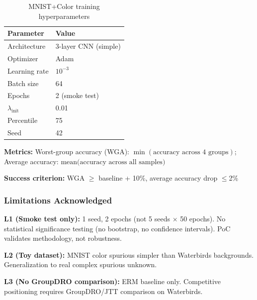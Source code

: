 \begin{table}[h]
\centering
\caption{MNIST+Color training hyperparameters}
\label{tab:mnist_config}
\begin{tabular}{ll}
\toprule
Parameter & Value \\
\midrule
Architecture & 3-layer CNN (simple) \\
Optimizer & Adam \\
Learning rate & $10^{-3}$ \\
Batch size & 64 \\
Epochs & 2 (smoke test) \\
$\lambda_{\text{init}}$ & 0.01 \\
Percentile & 75 \\
Seed & 42 \\
\bottomrule
\end{tabular}
\end{table}

\textbf{Metrics:}
Worst-group accuracy (WGA): $\min(\text{accuracy across 4 groups})$;
Average accuracy: $\text{mean(accuracy across all samples)}$

\textbf{Success criterion:} WGA $\geq$ baseline + 10\%, average accuracy drop $\leq$2\%

\subsubsection{Limitations Acknowledged}

\textbf{L1 (Smoke test only):} 1 seed, 2 epochs (not 5 seeds $\times$ 50 epochs). No statistical significance testing (no bootstrap, no confidence intervals). PoC validates methodology, not robustness.

\textbf{L2 (Toy dataset):} MNIST color spurious simpler than Waterbirds backgrounds. Generalization to real complex spurious unknown.

\textbf{L3 (No GroupDRO comparison):} ERM baseline only. Competitive positioning requires GroupDRO/JTT comparison on Waterbirds.
